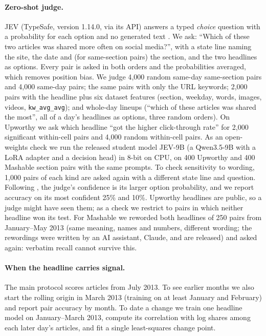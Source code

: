 \documentclass[10pt,a4paper,twocolumn]{article}
\begin{document}
\paragraph{Zero-shot judge.} JEV (TypeSafe, version 1.14.0, via its API) answers a typed \emph{choice} question
with a probability for each option and no generated text \citep{li2026jev}. We ask: ``Which of these two articles
was shared more often on social media?'', with a state line naming the site, the date and (for same-section pairs)
the section, and the two headlines as options. Every pair is asked in both orders and the probabilities averaged,
which removes position bias. We judge 4{,}000 random same-day same-section pairs and 4{,}000 same-day pairs; the
same pairs with only the URL keywords; 2{,}000 pairs with the headline plus six dataset features (section,
weekday, words, images, videos, \texttt{kw\_avg\_avg}); and whole-day lineups (``which of these articles was
shared the most'', all of a day's headlines as options, three random orders). On Upworthy we ask which headline
``got the higher click-through rate'' for 2{,}000 significant within-cell pairs and 4{,}000 random within-cell
pairs. As an open-weights check we run
the released student model JEV-9B (a Qwen3.5-9B with a LoRA adapter and a decision head) in 8-bit on CPU, on
400 Upworthy and 400 Mashable section pairs with the same prompts. To check sensitivity to wording, 1{,}000 pairs of
each kind are asked again with a different state line and question. Following \citet{li2026jev}, the judge's
confidence is its larger option probability, and we report accuracy on its most confident 25\% and 10\%. Upworthy
headlines are public, so a judge might have seen them; as a check we restrict to pairs in which neither headline
won its test. For Mashable we reworded both headlines of 250 pairs from January--May 2013 (same meaning, names and
numbers, different wording; the rewordings were written by an AI assistant, Claude, and are released) and asked
again: verbatim recall cannot survive this.

\paragraph{When the headline carries signal.} The main protocol scores articles from July 2013. To see earlier
months we also start the rolling origin in March 2013 (training on at least January and February) and report pair
accuracy by month. To date a change we train one headline model on January--March 2013, compute its correlation
with log shares among each later day's articles, and fit a single least-squares change point.
\end{document}
